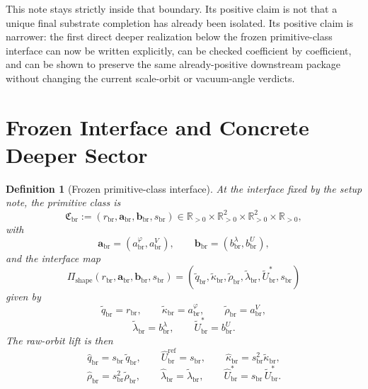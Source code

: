 \documentclass[11pt]{article}
\newcommand{\RespShapeReadout}{\widetilde q_{\mathrm{br}}}
\newcommand{\RespShapeCov}{\widetilde\kappa_{\mathrm{br}}}
\newcommand{\RespShapeRelax}{\widetilde\rho_{\mathrm{br}}}
\newcommand{\RespShapeWell}{\widetilde\lambda_{\mathrm{br}}}
\newcommand{\RespShapeEq}{\widetilde U_{\mathrm{br}}^{\ast}}
\newcommand{\RespRawReadout}{\widehat q_{\mathrm{br}}}
\newcommand{\RespRawRef}{\widehat U_{\mathrm{br}}^{\mathrm{ref}}}
\newcommand{\RespRawCov}{\widehat\kappa_{\mathrm{br}}}
\newcommand{\RespRawRelax}{\widehat\rho_{\mathrm{br}}}
\newcommand{\RespRawWell}{\widehat\lambda_{\mathrm{br}}}
\newcommand{\RespRawEq}{\widehat U_{\mathrm{br}}^{\ast}}
\newcommand{\ScaleMod}{s_{\mathrm{br}}}
\newcommand{\PrimClass}{\mathfrak C_{\mathrm{br}}}
\newcommand{\PrimRead}{r_{\mathrm{br}}}
\newcommand{\PrimCovSlot}{a_{\mathrm{br}}^{\varphi}}
\newcommand{\PrimRelaxSlot}{a_{\mathrm{br}}^{V}}
\newcommand{\PrimKinetic}{\bm a_{\mathrm{br}}}
\newcommand{\PrimWellSlot}{b_{\mathrm{br}}^{\lambda}}
\newcommand{\PrimEqSlot}{b_{\mathrm{br}}^{U}}
\newcommand{\PrimAnchor}{\bm b_{\mathrm{br}}}
\newcommand{\PrimMap}{\Pi_{\mathrm{shape}}}
\newtheorem{definition}{Definition}
\begin{document}
This note stays strictly inside that boundary. Its positive claim is not that a unique final substrate completion has already been isolated. Its positive claim is narrower: the first direct deeper realization below the frozen primitive-class interface can now be written explicitly, can be checked coefficient by coefficient, and can be shown to preserve the same already-positive downstream package without changing the current scale-orbit or vacuum-angle verdicts.

\section{Frozen Interface and Concrete Deeper Sector}

\begin{definition}[Frozen primitive-class interface]
\label{def:interface}
At the interface fixed by the setup note, the primitive class is
\begin{equation}
\PrimClass
:=
(\PrimRead,\PrimKinetic,\PrimAnchor,\ScaleMod)
\in
\mathbb R_{>0}\times\mathbb R_{>0}^{2}\times\mathbb R_{>0}^{2}\times\mathbb R_{>0},
\label{eq:primclass}
\end{equation}
with
\begin{equation}
\PrimKinetic=(\PrimCovSlot,\PrimRelaxSlot),
\qquad
\PrimAnchor=(\PrimWellSlot,\PrimEqSlot),
\label{eq:blocks}
\end{equation}
and the interface map
\begin{equation}
\PrimMap(\PrimRead,\PrimKinetic,\PrimAnchor,\ScaleMod)
=
(\RespShapeReadout,\RespShapeCov,\RespShapeRelax,\RespShapeWell,\RespShapeEq,\ScaleMod)
\label{eq:primmap}
\end{equation}
given by
\begin{equation}
\RespShapeReadout=\PrimRead,
\qquad
\RespShapeCov=\PrimCovSlot,
\qquad
\RespShapeRelax=\PrimRelaxSlot,
\label{eq:shapeA}
\end{equation}
\begin{equation}
\RespShapeWell=\PrimWellSlot,
\qquad
\RespShapeEq=\PrimEqSlot.
\label{eq:shapeB}
\end{equation}
The raw-orbit lift is then
\begin{equation}
\RespRawReadout=\ScaleMod\,\RespShapeReadout,
\qquad
\RespRawRef=\ScaleMod,
\qquad
\RespRawCov=\ScaleMod^{2}\RespShapeCov,
\label{eq:rawliftA}
\end{equation}
\begin{equation}
\RespRawRelax=\ScaleMod^{2}\RespShapeRelax,
\qquad
\RespRawWell=\RespShapeWell,
\qquad
\RespRawEq=\ScaleMod\,\RespShapeEq.
\label{eq:rawliftB}
\end{equation}
\end{definition}
\end{document}
